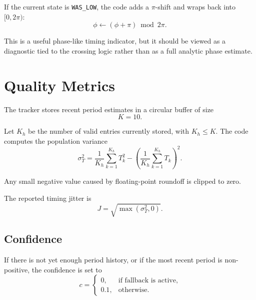 \documentclass[conference]{IEEEtran}
\begin{document}
    If the current state is \texttt{WAS\_LOW}, the code adds a \(\pi\)-shift and
    wraps back into \([0,2\pi)\):
    \begin{equation}
        \phi \leftarrow (\phi+\pi)\bmod 2\pi.
    \end{equation}

    This is a useful phase-like timing indicator, but it should be viewed as a
    diagnostic tied to the crossing logic rather than as a full analytic phase
    estimate.

    \section{Quality Metrics}

    The tracker stores recent period estimates in a circular buffer of size
    \begin{equation}
        K = 10.
    \end{equation}

    Let \(K_h\) be the number of valid entries currently stored, with
    \(K_h \le K\). The code computes the population variance
    \begin{equation}
        \sigma_T^2
        =
        \frac{1}{K_h}\sum_{k=1}^{K_h} T_k^2
        -
        \left(
        \frac{1}{K_h}\sum_{k=1}^{K_h} T_k
        \right)^2.
    \end{equation}

    Any small negative value caused by floating-point roundoff is clipped to zero.

    The reported timing jitter is
    \begin{equation}
        J = \sqrt{\max(\sigma_T^2,0)}.
    \end{equation}

    \subsection{Confidence}

    If there is not yet enough period history, or if the most recent period is
    non-positive, the confidence is set to
    \begin{equation}
        c =
        \begin{cases}
            0, & \text{if fallback is active},\\
            0.1, & \text{otherwise}.
        \end{cases}
    \end{equation}
\end{document}
